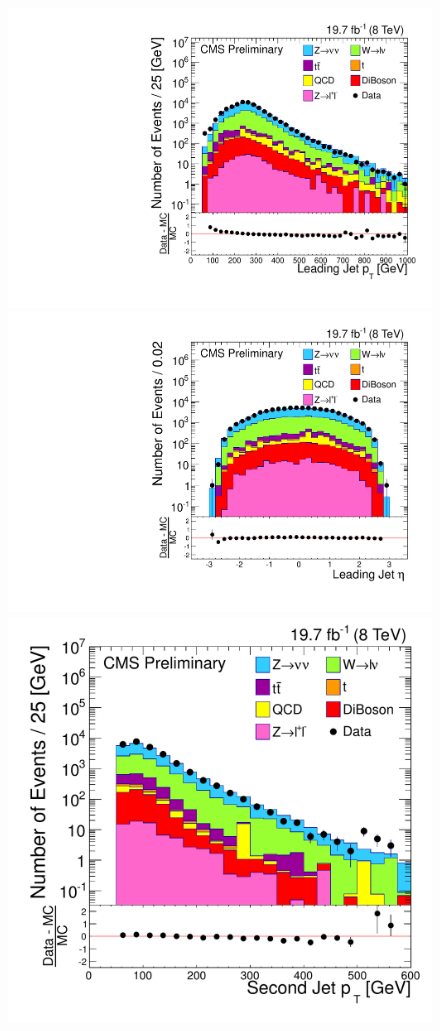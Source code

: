 \begin{figure}%
  \begin{center}
  \includegraphics[scale=0.32]     {Figures/sus13009/nocut/Jet1Pt.pdf}
  \includegraphics[scale=0.32]     {Figures/sus13009/nocut/Jet1Eta.pdf}
  \includegraphics[scale=0.32]     {Figures/sus13009/nocut/Jet2Pt_mod.pdf}

\end{center}
\end{figure}
